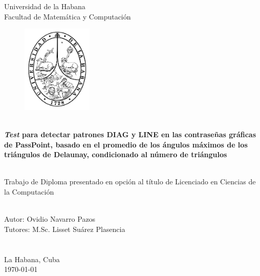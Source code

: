 \documentclass[12pt]{report}
\begin{document}
\begin{titlepage}
    \centering
    {\Huge {Universidad de la Habana}}\\[1cm]
    {\Huge {Facultad de Matemática y Computación }}\\[0.5cm]
 
    \begin{figure}[h]
    	\centering
    	\includegraphics[width=0.3\textwidth]{logoUH.png}
    	
    	
    \end{figure}
    {\noindent\hrulefill}\\[0.2cm]
    
    {\Large\textbf{{\textit{Test} para detectar patrones DIAG y LINE  en las contraseñas gráficas de PassPoint, basado en el promedio de los ángulos máximos de los triángulos de Delaunay, condicionado al número de triángulos }}}\\[0.1cm]
    {\noindent\hrulefill}\\[1.0cm]
    \begin{minipage}{0.8\textwidth}
    \begin{center}
    	{\Large Trabajo de Diploma presentado en opción al título de Licenciado en Ciencias de la Computación}
    	
    \end{center}
    \end{minipage}\\[1cm]
    
    
 
    
    {\Large {Autor: Ovidio Navarro Pazos}}\\[2cm]
   	{\Large {Tutores: M.Sc. Lisset Suárez Plasencia}}\\
   	\\
   	\\
   	[2.0cm]
   	
   	{\large{La Habana, Cuba}}\\
    {\large  \today}
\end{titlepage}
\end{document}
